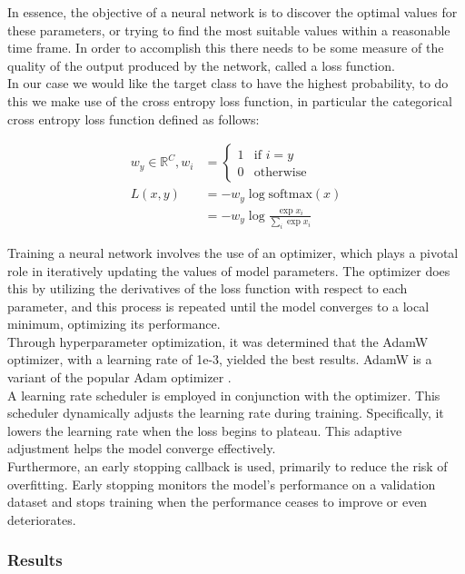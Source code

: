 \documentclass{article}
\begin{document}
In essence, the objective of a neural network is to discover the optimal values for these parameters, or trying to find the most suitable values within a reasonable time frame. In order to accomplish this there needs to be some measure of the quality of the output produced by the network, called a loss function.\\

In our case we would like the target class to have the highest probability, to do this we make use of the cross entropy loss function, in particular the categorical cross entropy loss function defined as follows:

\begin{align}
    w_y \in \mathbb{R}^C, w_i &= \begin{cases}
    1 & \text{if } i = y\\
    0 & \text{otherwise}
\end{cases} \\
    L(x,y) &= -w_y\log{\text{softmax}(x)} \\
    &= -w_y\log{\frac{\exp{x_i}}{\sum_i{\exp x_i}}}
\end{align}

Training a neural network involves the use of an optimizer, which plays a pivotal role in iteratively updating the values of model parameters. The optimizer does this by utilizing the derivatives of the loss function with respect to each parameter, and this process is repeated until the model converges to a local minimum, optimizing its performance.\\

Through hyperparameter optimization, it was determined that the AdamW optimizer, with a learning rate of 1e-3, yielded the best results. AdamW is a variant of the popular Adam optimizer \cite{loshchilov2019}.\\

A learning rate scheduler is employed in conjunction with the optimizer. This scheduler dynamically adjusts the learning rate during training. Specifically, it lowers the learning rate when the loss begins to plateau. This adaptive adjustment helps the model converge effectively.\\

Furthermore, an early stopping callback is used, primarily to reduce the risk of overfitting. Early stopping monitors the model's performance on a validation dataset and stops training when the performance ceases to improve or even deteriorates.

\subsubsection{Results}
\end{document}
